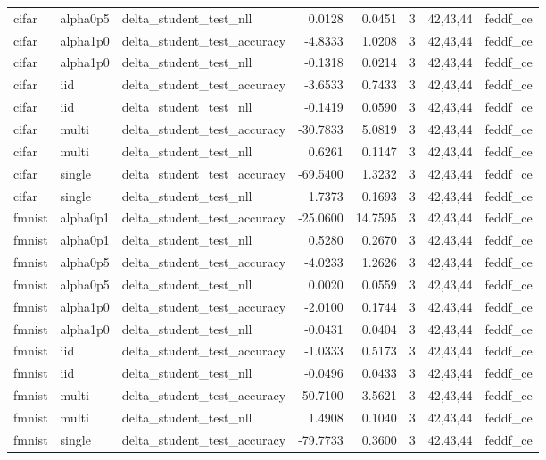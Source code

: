 \begin{tabular}{lllrrrll}
cifar & alpha0p5 & delta\_student\_test\_nll & 0.0128 & 0.0451 & 3 & 42,43,44 & feddf\_ce \\
cifar & alpha1p0 & delta\_student\_test\_accuracy & -4.8333 & 1.0208 & 3 & 42,43,44 & feddf\_ce \\
cifar & alpha1p0 & delta\_student\_test\_nll & -0.1318 & 0.0214 & 3 & 42,43,44 & feddf\_ce \\
cifar & iid & delta\_student\_test\_accuracy & -3.6533 & 0.7433 & 3 & 42,43,44 & feddf\_ce \\
cifar & iid & delta\_student\_test\_nll & -0.1419 & 0.0590 & 3 & 42,43,44 & feddf\_ce \\
cifar & multi & delta\_student\_test\_accuracy & -30.7833 & 5.0819 & 3 & 42,43,44 & feddf\_ce \\
cifar & multi & delta\_student\_test\_nll & 0.6261 & 0.1147 & 3 & 42,43,44 & feddf\_ce \\
cifar & single & delta\_student\_test\_accuracy & -69.5400 & 1.3232 & 3 & 42,43,44 & feddf\_ce \\
cifar & single & delta\_student\_test\_nll & 1.7373 & 0.1693 & 3 & 42,43,44 & feddf\_ce \\
fmnist & alpha0p1 & delta\_student\_test\_accuracy & -25.0600 & 14.7595 & 3 & 42,43,44 & feddf\_ce \\
fmnist & alpha0p1 & delta\_student\_test\_nll & 0.5280 & 0.2670 & 3 & 42,43,44 & feddf\_ce \\
fmnist & alpha0p5 & delta\_student\_test\_accuracy & -4.0233 & 1.2626 & 3 & 42,43,44 & feddf\_ce \\
fmnist & alpha0p5 & delta\_student\_test\_nll & 0.0020 & 0.0559 & 3 & 42,43,44 & feddf\_ce \\
fmnist & alpha1p0 & delta\_student\_test\_accuracy & -2.0100 & 0.1744 & 3 & 42,43,44 & feddf\_ce \\
fmnist & alpha1p0 & delta\_student\_test\_nll & -0.0431 & 0.0404 & 3 & 42,43,44 & feddf\_ce \\
fmnist & iid & delta\_student\_test\_accuracy & -1.0333 & 0.5173 & 3 & 42,43,44 & feddf\_ce \\
fmnist & iid & delta\_student\_test\_nll & -0.0496 & 0.0433 & 3 & 42,43,44 & feddf\_ce \\
fmnist & multi & delta\_student\_test\_accuracy & -50.7100 & 3.5621 & 3 & 42,43,44 & feddf\_ce \\
fmnist & multi & delta\_student\_test\_nll & 1.4908 & 0.1040 & 3 & 42,43,44 & feddf\_ce \\
fmnist & single & delta\_student\_test\_accuracy & -79.7733 & 0.3600 & 3 & 42,43,44 & feddf\_ce \\

\end{tabular}
